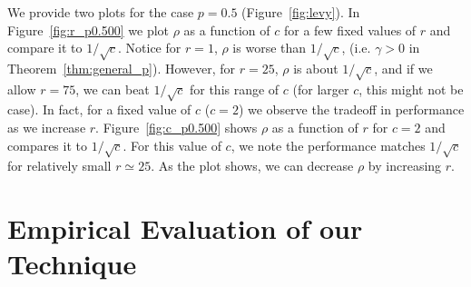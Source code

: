 \documentclass[12pt]{article}
\begin{document}
We provide two plots
for the case $p=0.5$ (Figure~\ref{fig:levy}). In
Figure~\ref{fig:r_p0.500} we plot $\rho$ as a function of $c$ for a few
fixed values of $r$ and compare it to $1/\sqrt{c}$.  Notice for $r=1$,
$\rho$ is worse than $1/\sqrt{c}$, (i.e. $\gamma>0$ in
Theorem~\ref{thm:general_p}).  However, for $r=25$, $\rho$ is about
$1/\sqrt{c}$, and if we allow $r=75$, we can beat $1/\sqrt{c}$ for this
range of $c$ (for larger $c$, this might not be case).  In fact,
for a fixed value of $c$ ($c=2$) we observe the tradeoff in
performance as we increase $r$.  Figure~\ref{fig:c_p0.500} shows $\rho$ as
a function of $r$ for $c=2$ and compares it to $1/\sqrt{c}$.  For this
value of $c$, we note the performance matches $1/\sqrt{c}$ for relatively
small $r\simeq25$.  As the plot shows, we can decrease $\rho$ by
increasing $r$.
\fi

\section{Empirical Evaluation of our Technique}
\label{Sec:expt} 

\end{document}
